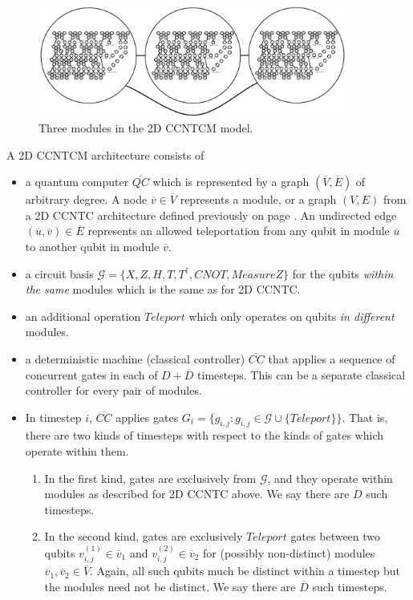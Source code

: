 \begin{figure}[btp!]
\begin{center}
\includegraphics[width=4in]{factor-polylog/figures/modules.pdf}
\end{center}
\caption{Three modules in the \textsf{2D CCNTCM} model.}
\label{fig:modules}
\end{figure}

\begin{definition}
A \textsf{2D CCNTCM} architecture consists of

\begin{itemize}
\item a quantum computer $\overline{QC}$ which is represented by a graph
$(\overline{V},\overline{E})$ of arbitrary degree.
A node $\overline{v} \in \overline{V}$ represents a module,
or a graph $(V,E)$
from a \textsf{2D CCNTC} architecture defined previously on page \pageref{subsec:2dccntc}.
An
undirected edge $(\overline{u},\overline{v}) \in \overline{E}$ represents an
allowed teleportation from any qubit in module $\overline{u}$ to
another qubit in module $\overline{v}$.
\item a circuit basis $\mathcal{G} = \{X, Z, H, T, T^{\dagger}, CNOT,
MeasureZ\}$
for the qubits \emph{within the same} modules which is the same as for \textsf{2D CCNTC}.
\item
an additional operation $Teleport$ which only operates on qubits
\emph{in
different} modules.
\item a deterministic machine (classical controller) $\overline{CC}$ that applies a sequence
of concurrent gates in each of $D+\overline{D}$ timesteps.
This can be a separate classical controller
for every pair of modules.
\item In timestep $i$, $\overline{CC}$ applies
gates $G_i = \{g_{i,j} : g_{i,j} \in \mathcal{G} \cup \{Teleport\} \}$.
That is, there are two kinds of timesteps with respect to the kinds of gates
which operate within them.
\begin{enumerate}
\item In the first kind, gates are exclusively from $\mathcal{G}$, and
they operate within modules as described
for \textsf{2D CCNTC} above. We say there are $D$ such timesteps.
\item In the second kind, gates are exclusively $Teleport$ gates between two qubits $v^{(1)}_{i,j} \in \overline{v}_1$ and
$v^{(2)}_{i,j} \in \overline{v}_2$ for
(possibly non-distinct) modules $\overline{v}_1, \overline{v}_2 \in \overline{V}$.
Again, all such qubits much be distinct within a timestep but the
modules need not be distinct.
We say there are $\overline{D}$ such timesteps.
\end{enumerate}


\end{itemize}
\end{definition}
